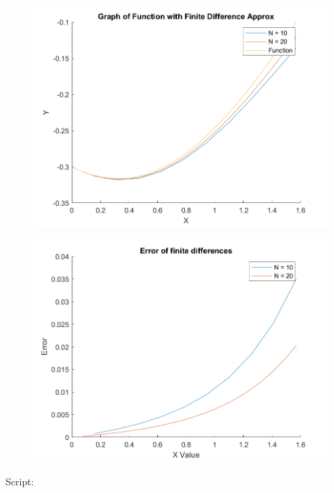 \documentclass[]{article}
\begin{document}
\begin{figure}
\centering
\includegraphics{./FinitePlot.png}
\caption{}
\end{figure}

\begin{figure}
\centering
\includegraphics{./FinitErr.png}
\caption{}
\end{figure}

Script:
\end{document}
